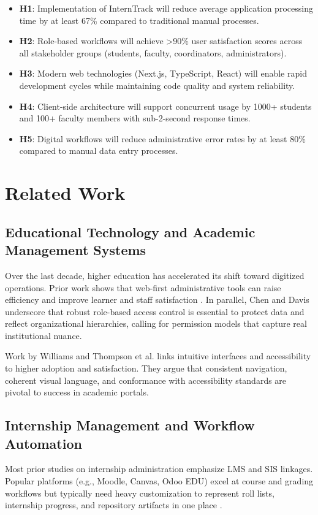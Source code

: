 \documentclass[conference]{IEEEtran}
\begin{document}
\begin{itemize}[leftmargin=*,nosep]
  \item \textbf{H1}: Implementation of InternTrack will reduce average application processing time by at least 67\% compared to traditional manual processes.
  \item \textbf{H2}: Role-based workflows will achieve >90\% user satisfaction scores across all stakeholder groups (students, faculty, coordinators, administrators).
  \item \textbf{H3}: Modern web technologies (Next.js, TypeScript, React) will enable rapid development cycles while maintaining code quality and system reliability.
  \item \textbf{H4}: Client-side architecture will support concurrent usage by 1000+ students and 100+ faculty members with sub-2-second response times.
  \item \textbf{H5}: Digital workflows will reduce administrative error rates by at least 80\% compared to manual data entry processes.
\end{itemize}

\section{Related Work}

\subsection{Educational Technology and Academic Management Systems}
Over the last decade, higher education has accelerated its shift toward digitized operations. Prior work shows that web-first administrative tools can raise efficiency and improve learner and staff satisfaction \cite{smith2020web, johnson2019user}. In parallel, Chen and Davis \cite{chen2021role} underscore that robust role-based access control is essential to protect data and reflect organizational hierarchies, calling for permission models that capture real institutional nuance.

Work by Williams \cite{williams2018user} and Thompson et al. \cite{thompson2022accessibility} links intuitive interfaces and accessibility to higher adoption and satisfaction. They argue that consistent navigation, coherent visual language, and conformance with accessibility standards are pivotal to success in academic portals.

\subsection{Internship Management and Workflow Automation}
Most prior studies on internship administration emphasize LMS and SIS linkages. Popular platforms (e.g., Moodle, Canvas, Odoo EDU) excel at course and grading workflows but typically need heavy customization to represent roll lists, internship progress, and repository artifacts in one place \cite{moodle2023, canvas2023}.
\end{document}
